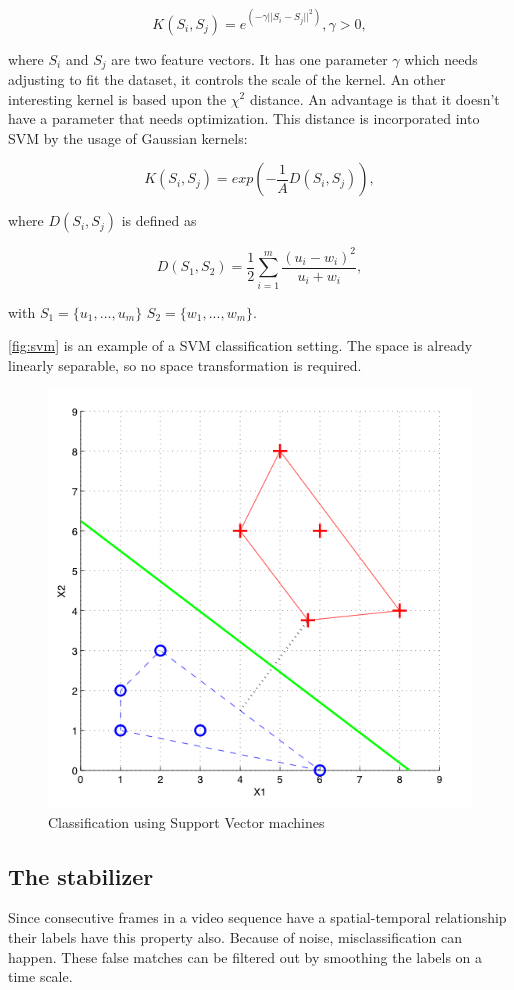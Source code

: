 \begin{equation}
	K(S_i,S_j) = e^{(-\gamma||S_i-S_j||^2)}, \gamma > 0,
\end{equation}

where $S_i$ and $S_j$ are two feature vectors. It has one parameter $\gamma$ which needs adjusting to fit the dataset, it controls the scale of the kernel. An other interesting kernel is based upon the $\chi^2$ distance\citep{Zhang2007}. An advantage is that it doesn't have a parameter that needs optimization. This distance is incorporated into SVM by the usage of Gaussian kernels\citep{Chapelle1999}:

\begin{equation}
	K(S_i,S_j) = exp(-\frac{1}{A}D(S_i,S_j)),
\end{equation}

where $D(S_i,S_j)$ is defined as

\begin{equation}
	D(S_1,S_2) = \frac{1}{2}\sum^{m}_{i=1}\frac{(u_i-w_i)^2}{u_i+w_i},
\end{equation}

with $S_1 = \{u_1, ... , u_m\}$ $S_2 = \{w_1, ... , w_m\}$.

\autoref{fig:svm} is an example of a SVM classification setting. The space is already linearly separable, so no space transformation is required. 

\begin{figure}[tb]
\center{}
\includegraphics[width=0.5\linewidth]{figures/svm2.png}
\caption{Classification using Support Vector machines}
\label{fig:svm}
\end{figure}




\subsection*{The stabilizer}
\label{subsec:stabilizer}
Since consecutive frames in a video sequence have a spatial-temporal relationship their labels have this property also. Because of noise, misclassification can happen. These false matches can be filtered out by smoothing the labels on a time scale.

